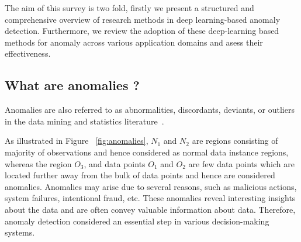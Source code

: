 The aim of this survey is two fold, firstly we present a structured and comprehensive overview of research methods in deep learning-based anomaly detection. Furthermore, we review the adoption of these deep-learning based methods for anomaly across various application domains and asess their effectiveness.

\subsection{ What are anomalies ?}
Anomalies  are also referred to as abnormalities, discordants, deviants, or outliers in the data mining and statistics literature~\cite{aggarwal2013introduction}.

As illustrated in Figure ~\ref{fig:anomalies}, $N_{1}$ and $N_{2}$ are regions consisting of majority of observations and hence considered as normal data instance regions, whereas the region $O_{3}$, and data points  $O_{1}$ and $O_{2}$  are few data points which are located further away from the bulk of data points and hence are considered anomalies. Anomalies may arise due to several reasons, such as malicious actions, system failures, intentional fraud, etc. These anomalies reveal interesting insights about the data and are often convey valuable information about data. Therefore, anomaly detection considered an essential step in various decision-making systems.

